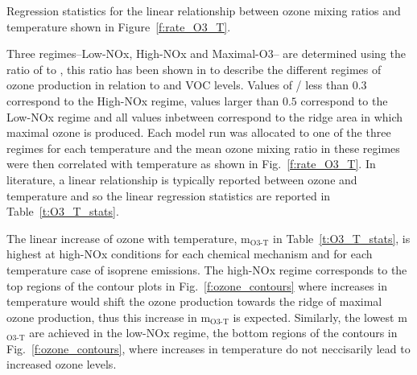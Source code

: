 \begin{table}%
    \centering%
    \caption{Regression statistics for the linear relationship between ozone mixing ratios and temperature shown in Figure~\ref{f:rate_O3_T}.}%
    \label{t:O3_T_stats}%
    
\end{table}

Three  regimes--Low-NOx, High-NOx and Maximal-O3-- are determined using the ratio of  to , this ratio has been shown in \citet{Sillman:1995} to describe the different regimes of ozone production in relation to  and VOC levels.
Values of / less than $0.3$ correspond to the High-NOx regime, values larger than $0.5$ correspond to the Low-NOx regime and all values inbetween correspond to the ridge area in which maximal ozone is produced.
Each model run was allocated to one of the three regimes for each temperature and the mean ozone mixing ratio in these  regimes were then correlated with temperature as shown in Fig.~\ref{f:rate_O3_T}.
In literature, a linear relationship is typically reported between ozone and temperature and so the linear regression statistics are reported in Table~\ref{t:O3_T_stats}.

The linear increase of ozone with temperature, m$_{\text{O3-T}}$ in Table~\ref{t:O3_T_stats}, is highest at high-NOx conditions for each chemical mechanism and for each temperature case of isoprene emissions.
The high-NOx regime corresponds to the top regions of the contour plots in Fig.~\ref{f:ozone_contours} where increases in temperature would shift the ozone production towards the ridge of maximal ozone production, thus this increase in m$_{\text{O3-T}}$ is expected.
Similarly, the lowest m$_{\text{O3-T}}$ are achieved in the low-NOx regime, the bottom regions of the contours in Fig.~\ref{f:ozone_contours}, where increases in temperature do not neccisarily lead to increased ozone levels.